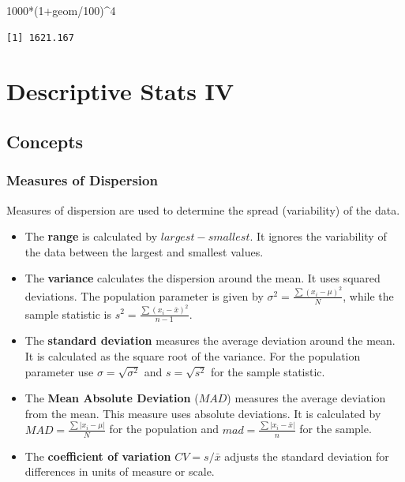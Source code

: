 \documentclass[
  letterpaper,
  DIV=11,
  numbers=noendperiod]{scrreprt}
\newenvironment{Shaded}{\begin{snugshade}}{\end{snugshade}}
\newcommand{\DecValTok}[1]{\textcolor[rgb]{0.68,0.00,0.00}{#1}}
\newcommand{\NormalTok}[1]{\textcolor[rgb]{0.00,0.23,0.31}{#1}}
\newcommand{\SpecialCharTok}[1]{\textcolor[rgb]{0.37,0.37,0.37}{#1}}
\begin{document}
\begin{Shaded}
\begin{Highlighting}[numbers=left,,]
\DecValTok{1000}\SpecialCharTok{*}\NormalTok{(}\DecValTok{1}\SpecialCharTok{+}\NormalTok{geom}\SpecialCharTok{/}\DecValTok{100}\NormalTok{)}\SpecialCharTok{\^{}}\DecValTok{4}
\end{Highlighting}
\end{Shaded}

\begin{verbatim}
[1] 1621.167
\end{verbatim}

\hypertarget{descriptive-stats-iv}{%
\chapter{Descriptive Stats IV}\label{descriptive-stats-iv}}

\hypertarget{concepts-3}{%
\section{Concepts}\label{concepts-3}}

\hypertarget{measures-of-dispersion}{%
\subsection*{Measures of Dispersion}\label{measures-of-dispersion}}

Measures of dispersion are used to determine the spread (variability) of
the data.

\begin{itemize}
\item
  The \textbf{range} is calculated by \(largest-smallest\). It ignores
  the variability of the data between the largest and smallest values.
\item
  The \textbf{variance} calculates the dispersion around the mean. It
  uses squared deviations. The population parameter is given by
  \(\sigma^2= \frac{\sum (x_i-\mu)^2}{N}\), while the sample statistic
  is \(s^2=\frac{\sum (x_i-\bar{x})^2}{n-1}\).
\item
  The \textbf{standard deviation} measures the average deviation around
  the mean. It is calculated as the square root of the variance. For the
  population parameter use \(\sigma=\sqrt{\sigma^2}\) and
  \(s=\sqrt{s^2}\) for the sample statistic.
\item
  The \textbf{Mean Absolute Deviation} (\(MAD\)) measures the average
  deviation from the mean. This measure uses absolute deviations. It is
  calculated by \(MAD=\frac{\sum |x_i-\mu|}{N}\) for the population and
  \(mad=\frac{\sum |x_i-\bar{x}|}{n}\) for the sample.
\item
  The \textbf{coefficient of variation} \(CV=s/\bar{x}\) adjusts the
  standard deviation for differences in units of measure or scale.
\end{itemize}
\end{document}
